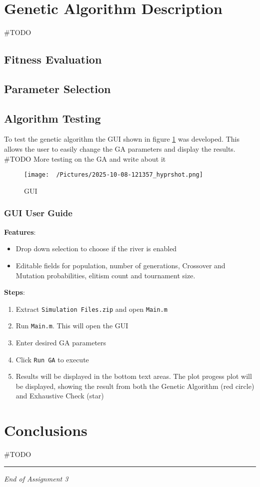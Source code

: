 \documentclass[12pt,a4paper]{article}
\begin{document}
\section{Genetic Algorithm Description}
\#TODO\\

\subsection{Fitness Evaluation}

\subsection{Parameter Selection}

\subsection{Algorithm Testing}
To test the genetic algorithm the GUI shown in figure \ref{fig:GUI} was developed. This allows the user to easily change the GA parameters and display the results. \\
\#TODO More testing on the GA and write about it
\begin{figure}[H]
	\centering
	\texttt{[image: ~/Pictures/2025-10-08-121357\_hyprshot.png]}
	\caption{GUI}
	\label{fig:GUI}
\end{figure}
\subsubsection{GUI User Guide}
\textbf{Features}:
\begin{itemize} 
	\item Drop down selection to choose if the river is enabled
	\item Editable fields for population, number of generations, Crossover and Mutation probabilities, elitism count and tournament size. 
\end{itemize}
\textbf{Steps}:
\begin{enumerate}
	\item [1)] Extract \texttt{Simulation Files.zip} and open \texttt{Main.m}
		\hfill
	\item [2)] Run \texttt{Main.m}. This will open the GUI
		\hfill
	\item [3)] Enter desired GA parameters
		\hfill
	\item [4)] Click \texttt{Run GA} to execute
		\hfill
	\item [5)] Results will be displayed in the bottom text areas. The plot progess plot will be displayed, showing the result from both the Genetic Algorithm (red circle) and Exhaustive Check (star)
		\hfill
\end{enumerate}
\section{Conclusions}
\#TODO
\vfill
\hrule
\begin{center}
\textit{End of Assignment 3}
\end{center}
\end{document}
